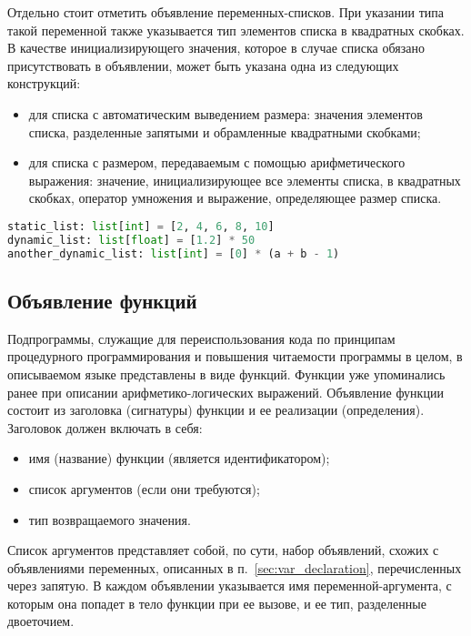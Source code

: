Отдельно стоит отметить объявление переменных-списков.
При указании типа такой переменной также указывается тип элементов списка в квадратных скобках.
В качестве инициализирующего значения, которое в случае списка обязано присутствовать в объявлении, может быть указана одна из следующих конструкций:

\begin{itemize}
    \item для списка с автоматическим выведением размера: значения элементов списка, разделенные запятыми и обрамленные квадратными скобками;
    \item для списка с размером, передаваемым с помощью арифметического выражения: значение, инициализирующее все элементы списка, в квадратных скобках, оператор умножения и выражение, определяющее размер списка.
\end{itemize}

\begin{lstlisting}[language=Python, caption=Примеры объявлений переменных типа list]
static_list: list[int] = [2, 4, 6, 8, 10]
dynamic_list: list[float] = [1.2] * 50
another_dynamic_list: list[int] = [0] * (a + b - 1)
\end{lstlisting}

\subsection{Объявление функций}

Подпрограммы, служащие для переиспользования кода по принципам процедурного программирования и повышения читаемости программы в целом, в описываемом языке представлены в виде функций.
Функции уже упоминались ранее при описании арифметико-логических выражений.
Объявление функции состоит из заголовка (сигнатуры) функции и ее реализации (определения).
Заголовок должен включать в себя:

\begin{itemize}
    \item имя (название) функции (является идентификатором);
    \item список аргументов (если они требуются);
    \item тип возвращаемого значения.
\end{itemize}

Список аргументов представляет собой, по сути, набор объявлений, схожих с объявлениями переменных, описанных в п.~\ref{sec:var_declaration}, перечисленных через запятую.
В каждом объявлении указывается имя переменной-аргумента, с которым она попадет в тело функции при ее вызове, и ее тип, разделенные двоеточием.

